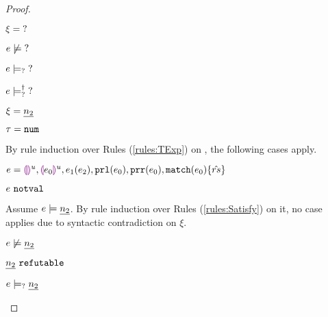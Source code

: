 \begin{proof}
\begin{byCases}
\item[\text{(\ref{rule:CTUnknown})}]
    \begin{pfsteps*}
    \item $\xi=\mathtt{?}$ 
    \item $e \not\models \mathtt{?}$ 
    \item $e \models_{?} \mathtt{?}$  
    \item $e \models_{?}^{\dag} \mathtt{?}$  
    \end{pfsteps*}
    
\item[\text{(\ref{rule:CTNum})}]
    \begin{pfsteps*}
    \item $\xi=\underline{n_2}$ 
    \item $\tau=\mathtt{num}$ 
    \end{pfsteps*}
    By rule induction over Rules (\ref{rules:TExp}) on , the following cases apply.
    \begin{byCases}
    \item[\text{(\ref{rule:TEHole}),(\ref{rule:THole}),(\ref{rule:TAp}),(\ref{rule:TPrl}),(\ref{rule:TPrr}),(\ref{rule:TMatchZPre}),(\ref{rule:TMatchNZPre})}]
        \begin{pfsteps*}
        \item $e=\textcolor{violet}{\llparenthesis}\textcolor{violet}{\rrparenthesis}^{u},\textcolor{violet}{\llparenthesis} e_0\textcolor{violet}{\rrparenthesis}^{u},e_1(e_2),\mathtt{prl}(e_0),\mathtt{prr}(e_0),\mathtt{match}(e_0) \{\hat{rs}\}$ 
        \item $e ~\mathtt{notval}$  
        \end{pfsteps*}
        Assume $e \models \underline{n_2}$. By rule induction over Rules (\ref{rules:Satisfy}) on it, no case applies due to syntactic contradiction on $\xi$.\\
        \begin{pfsteps*}
        \item $e \not\models \underline{n_2}$ 
        \item $\underline{n_2} ~\mathtt{refutable}$  
        \item $e \models_{?} \underline{n_2}$  

\end{pfsteps*}
\end{byCases}
\end{byCases}
\end{proof}
